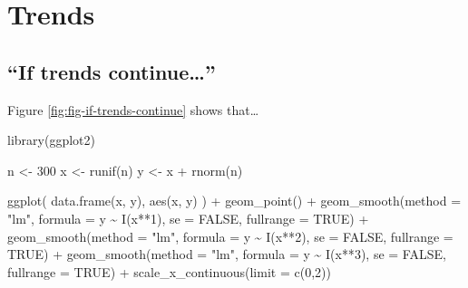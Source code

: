 \documentclass[
]{krantz}
\makeatletter
\newenvironment{Shaded}{\begin{snugshade}}{\end{snugshade}}
\newcommand{\AttributeTok}[1]{\textcolor[rgb]{0.61,0.61,0.61}{#1}}
\newcommand{\ConstantTok}[1]{\textcolor[rgb]{0,0,0}{#1}}
\newcommand{\DecValTok}[1]{\textcolor[rgb]{0.06,0.06,0.06}{#1}}
\newcommand{\FunctionTok}[1]{\textcolor[rgb]{0,0,0}{#1}}
\newcommand{\NormalTok}[1]{#1}
\newcommand{\OtherTok}[1]{\textcolor[rgb]{0.37,0.37,0.37}{#1}}
\newcommand{\SpecialCharTok}[1]{\textcolor[rgb]{0,0,0}{#1}}
\newcommand{\StringTok}[1]{\textcolor[rgb]{0.5,0.5,0.5}{#1}}
\newenvironment{kframe}{%
\medskip{}
\setlength{\fboxsep}{.8em}
 \def\at@end@of@kframe{}%
 \ifinner\ifhmode%
  \def\at@end@of@kframe{\end{minipage}}%
  \begin{minipage}{\columnwidth}%
 \fi\fi%
 \def\FrameCommand##1{\hskip\@totalleftmargin \hskip-\fboxsep
 \colorbox{shadecolor}{##1}\hskip-\fboxsep
     \hskip-\linewidth \hskip-\@totalleftmargin \hskip\columnwidth}%
 \MakeFramed {\advance\hsize-\width
   \@totalleftmargin\z@ \linewidth\hsize
   \@setminipage}}%
 {\par\unskip\endMakeFramed%
 \at@end@of@kframe}
\renewenvironment{Shaded}{\begin{kframe}}{\end{kframe}}
\makeatother
\begin{document}
\hypertarget{trends}{%
\section{Trends}\label{trends}}

\hypertarget{if-trends-continue}{%
\subsection{\texorpdfstring{``If trends continue\ldots{}''}{``If trends continue\ldots''}}\label{if-trends-continue}}

Figure \ref{fig:fig-if-trends-continue} shows that\ldots{}

\begin{Shaded}
\begin{Highlighting}[]
\FunctionTok{library}\NormalTok{(ggplot2)}

\NormalTok{n }\OtherTok{\textless{}{-}} \DecValTok{300}
\NormalTok{x }\OtherTok{\textless{}{-}} \FunctionTok{runif}\NormalTok{(n)}
\NormalTok{y }\OtherTok{\textless{}{-}}\NormalTok{ x }\SpecialCharTok{+} \FunctionTok{rnorm}\NormalTok{(n)}

\FunctionTok{ggplot}\NormalTok{(}
  \FunctionTok{data.frame}\NormalTok{(x, y),}
  \FunctionTok{aes}\NormalTok{(x, y)}
\NormalTok{  ) }\SpecialCharTok{+}
  \FunctionTok{geom\_point}\NormalTok{() }\SpecialCharTok{+}
  \FunctionTok{geom\_smooth}\NormalTok{(}\AttributeTok{method =} \StringTok{"lm"}\NormalTok{, }\AttributeTok{formula =}\NormalTok{ y }\SpecialCharTok{\textasciitilde{}} \FunctionTok{I}\NormalTok{(x}\SpecialCharTok{**}\DecValTok{1}\NormalTok{), }\AttributeTok{se =} \ConstantTok{FALSE}\NormalTok{, }\AttributeTok{fullrange =} \ConstantTok{TRUE}\NormalTok{) }\SpecialCharTok{+}
  \FunctionTok{geom\_smooth}\NormalTok{(}\AttributeTok{method =} \StringTok{"lm"}\NormalTok{, }\AttributeTok{formula =}\NormalTok{ y }\SpecialCharTok{\textasciitilde{}} \FunctionTok{I}\NormalTok{(x}\SpecialCharTok{**}\DecValTok{2}\NormalTok{), }\AttributeTok{se =} \ConstantTok{FALSE}\NormalTok{, }\AttributeTok{fullrange =} \ConstantTok{TRUE}\NormalTok{) }\SpecialCharTok{+}
  \FunctionTok{geom\_smooth}\NormalTok{(}\AttributeTok{method =} \StringTok{"lm"}\NormalTok{, }\AttributeTok{formula =}\NormalTok{ y }\SpecialCharTok{\textasciitilde{}} \FunctionTok{I}\NormalTok{(x}\SpecialCharTok{**}\DecValTok{3}\NormalTok{), }\AttributeTok{se =} \ConstantTok{FALSE}\NormalTok{, }\AttributeTok{fullrange =} \ConstantTok{TRUE}\NormalTok{) }\SpecialCharTok{+}
  \FunctionTok{scale\_x\_continuous}\NormalTok{(}\AttributeTok{limit =} \FunctionTok{c}\NormalTok{(}\DecValTok{0}\NormalTok{,}\DecValTok{2}\NormalTok{))}
\end{Highlighting}
\end{Shaded}
\end{document}
